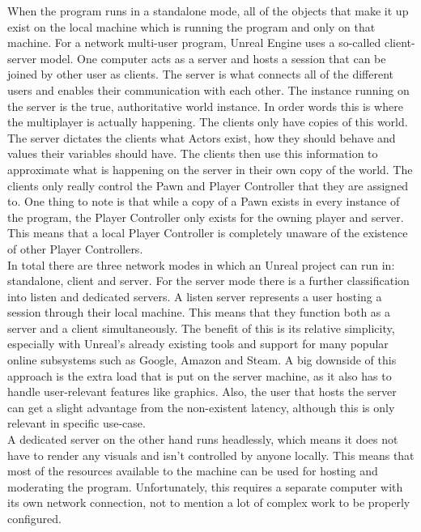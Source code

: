 When the program runs in a standalone mode, all of the objects that make it up exist on the local machine which is running the program and only on that machine. For a network multi-user program, Unreal Engine uses a so-called client-server model\cite{bib:UENetwoking}. One computer acts as a server and hosts a session that can be joined by other user as clients. The server is what connects all of the different users and enables their communication with each other. The instance running on the server is the true, authoritative world instance. In order words this is where the multiplayer is actually happening. The clients only have copies of this world. The server dictates the clients what Actors exist, how they should behave and values their variables should have. The clients then use this information to approximate what is happening on the server in their own copy of the world. The clients only really control the Pawn and Player Controller that they are assigned to. One thing to note is that while a copy of a Pawn exists in every instance of the program, the Player Controller only exists for the owning player and server. This means that a local Player Controller is completely unaware of the existence of other Player Controllers.\\

In total there are three network modes in which an Unreal project can run in: standalone, client and server\cite{bib:UENetwoking}. For the server mode there is a further classification into listen and dedicated servers. A listen server represents a user hosting a session through their local machine. This means that they function both as a server and a client simultaneously. The benefit of this is its relative simplicity, especially with Unreal's already existing tools and support for many popular online subsystems such as Google, Amazon and Steam\cite{bib:UEOnlSuS}. A big downside of this approach is the extra load that is put on the server machine, as it also has to handle user-relevant features like graphics. Also, the user that hosts the server can get a slight advantage from the non-existent latency, although this is only relevant in specific use-case.\\
A dedicated server on the other hand runs \glqq headlessly\grqq, which means it does not have to render any visuals and isn't controlled by anyone locally. This means that most of the resources available to the machine can be used for hosting and moderating the program. Unfortunately, this requires a separate computer with its own network connection, not to mention a lot of complex work to be properly configured.\\

